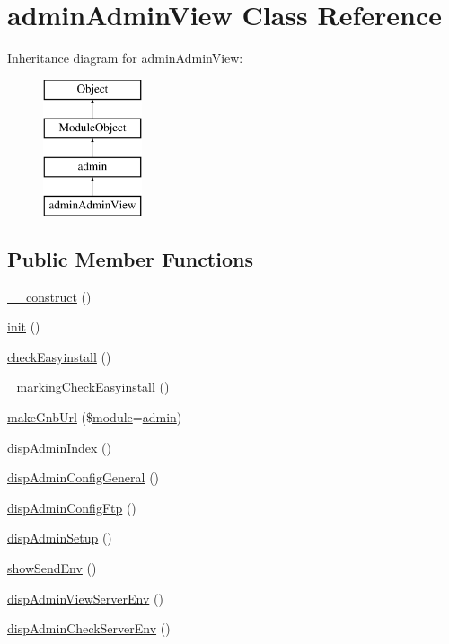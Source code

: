 \hypertarget{classadminAdminView}{}\section{admin\+Admin\+View Class Reference}
\label{classadminAdminView}
Inheritance diagram for admin\+Admin\+View\+:\begin{figure}[H]
\begin{center}
\leavevmode
\includegraphics[height=4.000000cm]{classadminAdminView}
\end{center}
\end{figure}
\subsection*{Public Member Functions}
\begin{DoxyCompactItemize}
\item 
\hyperlink{classadminAdminView_a8bf927cf8a3c6554d083a29f90a8e3eb}{\+\_\+\+\_\+construct} ()
\item 
\hyperlink{classadminAdminView_a9211d29a895ebead46f78e6fc9eab285}{init} ()
\item 
\hyperlink{classadminAdminView_ae7b11554f7c30beb8554d15b33852dd7}{check\+Easyinstall} ()
\item 
\hyperlink{classadminAdminView_ad1fe5e140900ad8f5814871ed6ae9508}{\+\_\+marking\+Check\+Easyinstall} ()
\item 
\hyperlink{classadminAdminView_a6f715be781a41d811166af0ae66b3b93}{make\+Gnb\+Url} (\$\hyperlink{classmodule}{module}=\textquotesingle{}\hyperlink{classadmin}{admin}\textquotesingle{})
\item 
\hyperlink{classadminAdminView_aff78cea8f2e5632395dd4888742389b8}{disp\+Admin\+Index} ()
\item 
\hyperlink{classadminAdminView_accaee16084bc6def9e841518d227be0e}{disp\+Admin\+Config\+General} ()
\item 
\hyperlink{classadminAdminView_ac1d596c739213d4fd3f127a6ca18c155}{disp\+Admin\+Config\+Ftp} ()
\item 
\hyperlink{classadminAdminView_acfa4a5d1209080974ca5fd15d04565e9}{disp\+Admin\+Setup} ()
\item 
\hyperlink{classadminAdminView_a4c4c900f637d618a7c8fbcbf523ad801}{show\+Send\+Env} ()
\item 
\hyperlink{classadminAdminView_a6b110bb8ccba975a670fdfbe559f7118}{disp\+Admin\+View\+Server\+Env} ()
\item 
\hyperlink{classadminAdminView_a4041d717f643f568e4aad570e8a60e47}{disp\+Admin\+Check\+Server\+Env} ()
\end{DoxyCompactItemize}

